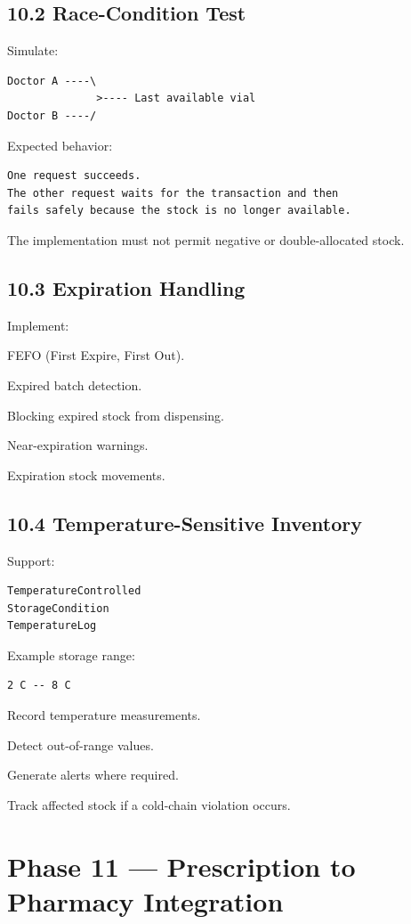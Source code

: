 \documentclass[11pt,a4paper]{article}
\newcommand{\task}[1]{\item[$\square$] #1}
\begin{document}
\subsection{10.2 Race-Condition Test}

Simulate:

\begin{lstlisting}
Doctor A ----\
              >---- Last available vial
Doctor B ----/
\end{lstlisting}

Expected behavior:

\begin{lstlisting}
One request succeeds.
The other request waits for the transaction and then
fails safely because the stock is no longer available.
\end{lstlisting}

The implementation must not permit negative or double-allocated stock.

\subsection{10.3 Expiration Handling}

Implement:

\task{FEFO (First Expire, First Out).}
\task{Expired batch detection.}
\task{Blocking expired stock from dispensing.}
\task{Near-expiration warnings.}
\task{Expiration stock movements.}

\subsection{10.4 Temperature-Sensitive Inventory}

Support:

\begin{lstlisting}
TemperatureControlled
StorageCondition
TemperatureLog
\end{lstlisting}

Example storage range:

\begin{lstlisting}
2 C -- 8 C
\end{lstlisting}

\task{Record temperature measurements.}
\task{Detect out-of-range values.}
\task{Generate alerts where required.}
\task{Track affected stock if a cold-chain violation occurs.}

\section{Phase 11 --- Prescription to Pharmacy Integration}
\end{document}
